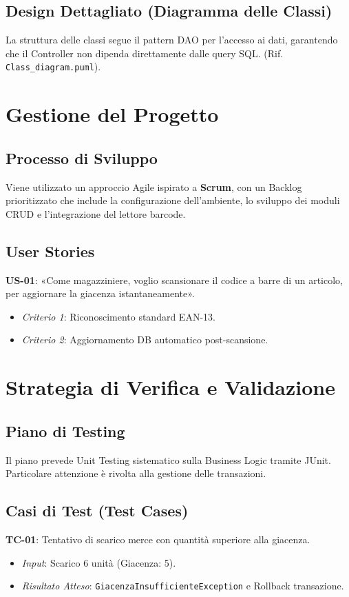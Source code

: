 \documentclass[a4paper,12pt]{article}
\begin{document}
\subsection{Design Dettagliato (Diagramma delle Classi)}
La struttura delle classi segue il pattern DAO per l'accesso ai dati, garantendo che il Controller non dipenda direttamente dalle query SQL. (Rif. \texttt{Class\_diagram.puml}).

\section{Gestione del Progetto}
\subsection{Processo di Sviluppo}
Viene utilizzato un approccio Agile ispirato a \textbf{Scrum}, con un Backlog prioritizzato che include la configurazione dell'ambiente, lo sviluppo dei moduli CRUD e l'integrazione del lettore barcode.

\subsection{User Stories}
\textbf{US-01}: «Come magazziniere, voglio scansionare il codice a barre di un articolo, per aggiornare la giacenza istantaneamente».
\begin{itemize}
    \item \textit{Criterio 1}: Riconoscimento standard EAN-13.
    \item \textit{Criterio 2}: Aggiornamento DB automatico post-scansione.
\end{itemize}

\section{Strategia di Verifica e Validazione}
\subsection{Piano di Testing}
Il piano prevede Unit Testing sistematico sulla Business Logic tramite JUnit. Particolare attenzione è rivolta alla gestione delle transazioni.

\subsection{Casi di Test (Test Cases)}
\textbf{TC-01}: Tentativo di scarico merce con quantità superiore alla giacenza.
\begin{itemize}
    \item \textit{Input}: Scarico 6 unità (Giacenza: 5).
    \item \textit{Risultato Atteso}: \texttt{GiacenzaInsufficienteException} e Rollback transazione.
\end{itemize}
\end{document}
